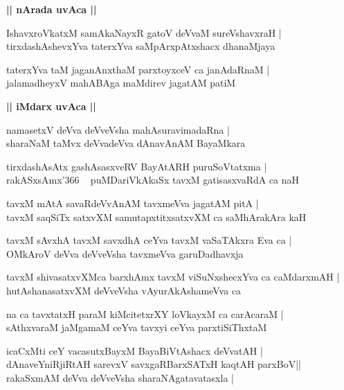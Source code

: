 \documentclass[twoside,12pt,openright]{book}
\newcounter{shloka}[chapter]
\def\uvaca#1{\centerline{{\large\textbf{#1}}}}
\begin{document}
\uvaca{|| nArada uvAca ||}

\begin{shloka}%
IshavxroVkatxM samAkaNayxR gatoV deVvaM sureVshavxraH |\\
tirxdashAshevxYva taterxYva saMpArxpAtxshacx dhanaMjaya
\end{shloka}

\begin{shloka}%
taterxYva taM jaganAnxthaM parxtoyxceV ca janAdaRnaM |\\
jalamadheyxV mahABAga maMdirev jagatAM patiM 
\end{shloka}

\uvaca{|| iMdarx uvAca ||}

\begin{shloka}%
namasetxV deVva deVveVsha mahAsuravimadaRna |\\
sharaNaM taMvx deVvadeVva dAnavAnAM BayaMkara
\end{shloka}

\begin{shloka}%
tirxdashAsAtx gashAsasxveRV BayAtARH puruSoVtatxma |\\
rakASxsAmx\char'366 ~ puMDariVkAkaSx tavxM gatisasxvaRdA ca naH 
\end{shloka}

\begin{shloka}%
tavxM mAtA savaRdeVvAnAM tavxmeVva jagatAM pitA |\\
tavxM saqSiTx satxvXM samutapxtitxsatxvXM ca saMhArakAra kaH 
\end{shloka}

\begin{shloka}%
tavxM sAvxhA tavxM savxdhA ceYva tavxM vaSaTAkxra Eva ca |\\
OMkAroV deVva deVveVsha tavxmeVva garuDadhavxja
\end{shloka}

\begin{shloka}%
tavxM shivasatxvXMca barxhAmx tavxM viSuNxshecxYva ca caMdarxmAH |\\
hutAshanasatxvXM deVveVsha vAyurAkAshameVva ca
\end{shloka}

\begin{shloka}%
na ca tavxtatxH paraM kiMcitetxrXY loVkayxM ca carAcaraM |\\
sAthxvaraM jaMgamaM ceYva tavxyi ceYva parxtiSiThxtaM 
\end{shloka}

\begin{shloka}%
icaCxMti ceY vacasutxBayxM BayaBiVtAshacx deVvatAH |\\
dAnaveYniRjiRtAH sarevxV savxgaRBarxSATxH kaqtAH parxBoV||\\
rakaSxmAM deVva deVveVsha sharaNAgatavatasxla |\\
\end{shloka}
\end{document}
